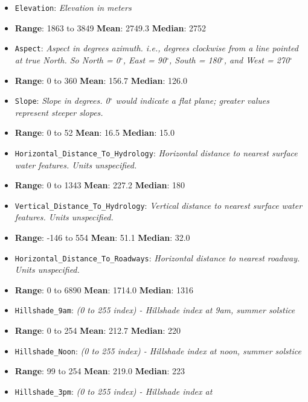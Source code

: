 \documentclass[11pt]{article}
\begin{document}
\begin{itemize}
\item
  \texttt{Elevation}: \emph{Elevation in meters}
\item
  \textbf{Range}: 1863 to 3849 \textbar{} \textbf{Mean}: 2749.3
  \textbar{} \textbf{Median}: 2752
\item
  \texttt{Aspect}: \emph{Aspect in degrees azimuth. i.e., degrees
  clockwise from a line pointed at true North. So North = 0\(^\circ\),
  East = 90\(^\circ\), South = 180\(^\circ\), and West = 270\(^\circ\)}
\item
  \textbf{Range}: 0 to 360 \textbar{} \textbf{Mean}: 156.7 \textbar{}
  \textbf{Median}: 126.0
\item
  \texttt{Slope}: \emph{Slope in degrees. 0\(^\circ\) would indicate a
  flat plane; greater values represent steeper slopes.}
\item
  \textbf{Range}: 0 to 52 \textbar{} \textbf{Mean}: 16.5 \textbar{}
  \textbf{Median}: 15.0
\item
  \texttt{Horizontal\_Distance\_To\_Hydrology}: \emph{Horizontal
  distance to nearest surface water features. Units unspecified.}
\item
  \textbf{Range}: 0 to 1343 \textbar{} \textbf{Mean}: 227.2 \textbar{}
  \textbf{Median}: 180
\item
  \texttt{Vertical\_Distance\_To\_Hydrology}: \emph{Vertical distance to
  nearest surface water features. Units unspecified.}
\item
  \textbf{Range}: -146 to 554 \textbar{} \textbf{Mean}: 51.1 \textbar{}
  \textbf{Median}: 32.0
\item
  \texttt{Horizontal\_Distance\_To\_Roadways}: \emph{Horizontal distance
  to nearest roadway. Units unspecified.}
\item
  \textbf{Range}: 0 to 6890 \textbar{} \textbf{Mean}: 1714.0 \textbar{}
  \textbf{Median}: 1316
\item
  \texttt{Hillshade\_9am}: \emph{(0 to 255 index) - Hillshade index at
  9am, summer solstice}
\item
  \textbf{Range}: 0 to 254 \textbar{} \textbf{Mean}: 212.7 \textbar{}
  \textbf{Median}: 220
\item
  \texttt{Hillshade\_Noon}: \emph{(0 to 255 index) - Hillshade index at
  noon, summer solstice}
\item
  \textbf{Range}: 99 to 254 \textbar{} \textbf{Mean}: 219.0 \textbar{}
  \textbf{Median}: 223
\item
  \texttt{Hillshade\_3pm}: \emph{(0 to 255 index) - Hillshade index at
}
\end{itemize}
\end{document}
